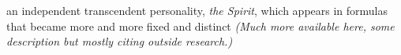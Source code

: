 \begin{compactdesc}
\begin{compactitem}
							\item[8] an independent transcendent personality, \textit{the Spirit}, which appears in formulas that became more and more fixed and distinct \textit{(Much more available here, some description but mostly citing outside research.)}
						\end{compactitem}
					\item[LSJ , PDF ] \textbf{}
						\begin{compactitem}
							\item 
						\end{compactitem}
				\end{compactdesc}
				
				\begin{compactdesc}
					\item[Some NT uses] \textbf{}
						\begin{compactdesc}
							\item[]
						\end{compactdesc}
				\end{compactdesc}
		
	
		
		
	
		
		
	
